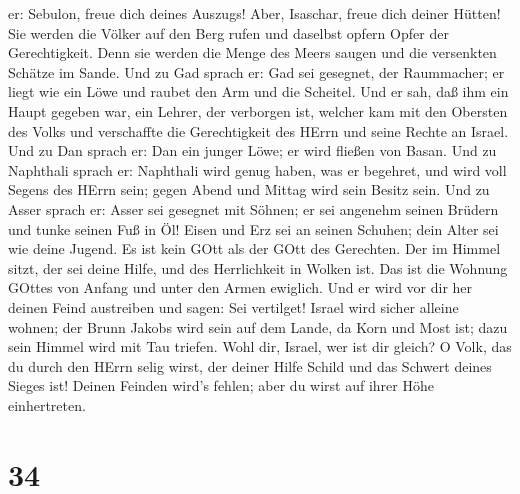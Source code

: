 er: Sebulon, freue dich deines Auszugs! Aber, Isaschar, freue dich
deiner Hütten!  Sie werden die Völker auf den Berg rufen
und daselbst opfern Opfer der Gerechtigkeit. Denn sie werden die Menge
des Meers saugen und die versenkten Schätze im Sande.  Und
zu Gad sprach er: Gad sei gesegnet, der Raummacher; er liegt wie ein
Löwe und raubet den Arm und die Scheitel.  Und er sah, daß
ihm ein Haupt gegeben war, ein Lehrer, der verborgen ist, welcher kam
mit den Obersten des Volks und verschaffte die Gerechtigkeit des HErrn
und seine Rechte an Israel.  Und zu Dan sprach er: Dan ein
junger Löwe; er wird fließen von Basan.  Und zu Naphthali
sprach er: Naphthali wird genug haben, was er begehret, und wird voll
Segens des HErrn sein; gegen Abend und Mittag wird sein Besitz sein.
 Und zu Asser sprach er: Asser sei gesegnet mit Söhnen; er
sei angenehm seinen Brüdern und tunke seinen Fuß in Öl! 
Eisen und Erz sei an seinen Schuhen; dein Alter sei wie deine Jugend.
 Es ist kein GOtt als der GOtt des Gerechten. Der im Himmel
sitzt, der sei deine Hilfe, und des Herrlichkeit in Wolken ist.
 Das ist die Wohnung GOttes von Anfang und unter den Armen
ewiglich. Und er wird vor dir her deinen Feind austreiben und sagen: Sei
vertilget!  Israel wird sicher alleine wohnen; der Brunn
Jakobs wird sein auf dem Lande, da Korn und Most ist; dazu sein Himmel
wird mit Tau triefen.  Wohl dir, Israel, wer ist dir
gleich? O Volk, das du durch den HErrn selig wirst, der deiner Hilfe
Schild und das Schwert deines Sieges ist! Deinen Feinden wird's fehlen;
aber du wirst auf ihrer Höhe einhertreten.

\hypertarget{section-33}{%
\section{34}\label{section-33}}

